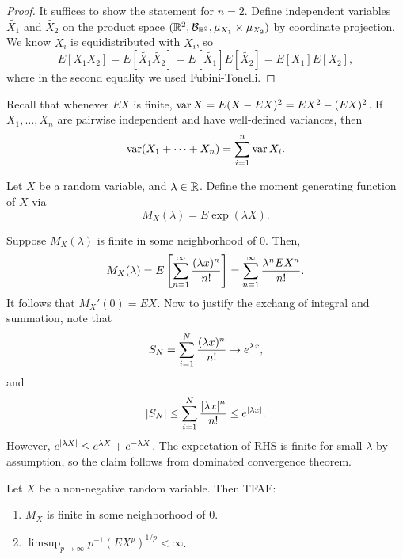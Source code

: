 \documentclass[a4paper]{article}
\begin{document}
\begin{proof}
  It suffices to show the statement for $n = 2$. Define 
  independent variables $\tilde{X_1}$ and $\tilde{X_2}$ 
  on the product space $(\mathbb{R}^2, \mathcal{B}_{\mathbb{R}^2}, \mu_{X_1} \times \mu_{X_2})$
  by coordinate projection. We know $\tilde{X_i}$ is equidistributed 
  with $X_i$, so 
  \[
  E [X_1 X_2] = E [\tilde{X_1} \tilde{X_2}] = E [\tilde{X_1} ] E 
  [ \tilde{X_2} ] = E [X_1] E [X_2] ,
  \]
  where in the second equality we used Fubini-Tonelli.

\end{proof}

\begin{remark}
  Recall that whenever $E X$ is finite, $\operatorname{var} X = E (X - E X)^2
  = E X^2 - (E X)^2$. If $X_1, \dots, X_n$ are pairwise independent
  and have well-defined variances, then 
  \[
  \operatorname{var} (X_1 + \dots + X_n) = \sum_{i=1}^n \operatorname{var} X_i.
  \]
\end{remark}

\begin{defi}
  Let $X$ be a random variable, and $\lambda \in \mathbb{R}$. Define the 
  moment generating function of $X$ via 
  \[
  M_X (\lambda) = E \exp (\lambda X).
  \] 
\end{defi}

Suppose $M_X (\lambda)$ is finite in some neighborhood of $0$. Then,
\[
M_X (\lambda) 
= E \left[ \sum_{n=1}^\infty \frac{(\lambda x)^n}{n!} \right]
= \sum_{n=1}^\infty \frac{\lambda^n E X^n}{n!}.
\]
It follows that $M_X' (0) = E X$. Now to justify the exchang of 
integral and summation, note that 
\[
S_N = \sum_{i=1}^N \frac{(\lambda x)^n}{n!} \to e^{\lambda x},
\]
and 
\[
\left\lvert S_N\right\rvert \leq \sum_{i=1}^N \frac{\left\lvert \lambda x\right\rvert^n}{n!} 
\leq e^{\left\lvert \lambda x\right\rvert}.
\]
However, $e^{\left\lvert \lambda X\right\rvert} \leq e^{\lambda X} + e^{- \lambda X}$.
The expectation of RHS is finite for small $\lambda$ by assumption,
so the claim follows from dominated convergence theorem.

\begin{prop}
  Let $X$ be a non-negative random variable. Then TFAE:
  \begin{enumerate}
    \item $M_X$ is finite in some neighborhood of $0$.
    \item $\limsup_{p \to \infty} p^{-1} (E X^p)^{1 / p} < \infty$.
  \end{enumerate}
\end{prop}
\end{document}
